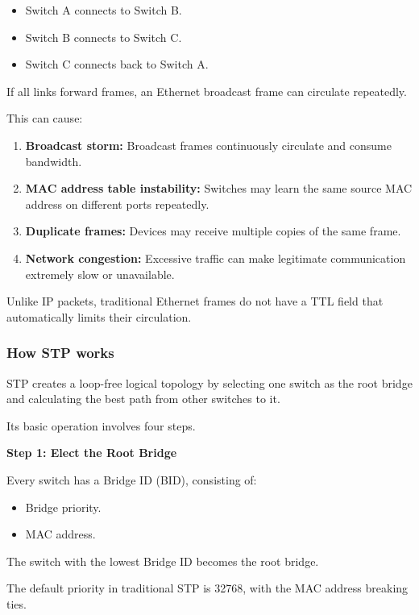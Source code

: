 \begin{itemize}
\item Switch A connects to Switch B.
\item Switch B connects to Switch C.
\item Switch C connects back to Switch A.
\end{itemize}

If all links forward frames, an Ethernet broadcast frame can circulate repeatedly.

This can cause:

\begin{enumerate}
\item \textbf{Broadcast storm:} Broadcast frames continuously circulate and consume bandwidth.
\item \textbf{MAC address table instability:} Switches may learn the same source MAC address on different ports repeatedly.
\item \textbf{Duplicate frames:} Devices may receive multiple copies of the same frame.
\item \textbf{Network congestion:} Excessive traffic can make legitimate communication extremely slow or unavailable.
\end{enumerate}

Unlike IP packets, traditional Ethernet frames do not have a TTL field that automatically limits their circulation.

\subsubsection{How STP works}

STP creates a loop-free logical topology by selecting one switch as the root bridge and calculating the best path from other switches to it.

Its basic operation involves four steps.

\textbf{Step 1: Elect the Root Bridge}

Every switch has a Bridge ID (BID), consisting of:

\begin{itemize}
\item Bridge priority.
\item MAC address.
\end{itemize}

The switch with the lowest Bridge ID becomes the root bridge.

The default priority in traditional STP is 32768, with the MAC address breaking ties.

